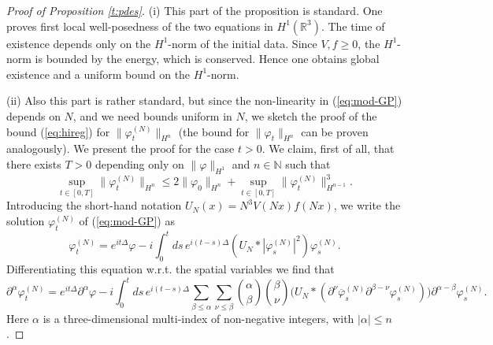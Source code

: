 \documentclass[11pt,a4paper]{article}
\newcommand{\done}{}
\newcommand{\bR}{{\mathbb R}}
\newcommand{\bN}{{\mathbb N}}
\newcommand{\cE}{{\cal E}}
\newcommand{\ph}{\varphi_t^{(N)}}	%
\begin{document}
\begin{proof}[Proof of Proposition \ref{t:pdes}] 
(i) This part of the proposition is standard. One proves first local well-posedness of the two equations in $H^1 (\bR^3)$. The time of existence depends only on the $H^1$-norm of the initial data. Since $V,f \geq 0$, the $H^1$-norm is bounded by the energy, which is conserved.  
Hence one obtains global existence and a uniform bound on the $H^1$-norm. 

(ii) Also this part is rather standard, but since the non-linearity in (\ref{eq:mod-GP}) depends on $N$, and we need bounds uniform in $N$, we sketch the proof of the bound (\ref{eq:hireg}) for $\| \varphi_t^{(N)} \|_{H^n}$ (the bound for $\| \varphi_t \|_{H^n}$ can be proven analogously). We present the proof for the case $t >0$. We claim, first of all, that there exists $T>0$ depending only on $\| \varphi \|_{H^1}$ and $n \in \bN$ such that
  \begin{equation}\label{eq:preregularity}
    \sup_{t \in [0,T]} \| \varphi_t^{(N)} \|_{H^n} \le 2 \| \varphi_0 \|_{H^n} +
     \sup_{t \in [0,T]} \| \varphi_t^{(N)} \|_{H^{n-1}}^3.\done
 \end{equation}
 Introducing the short-hand notation $U_N (x)= N^3 V(Nx)f(Nx)$, we write the solution 
$\varphi_t^{(N)}$ of (\ref{eq:mod-GP}) as
\[
\varphi^{(N)}_t = e^{it\Delta} \varphi - i \int_0^t ds \, e^{i(t-s)\Delta} (U_N *
|\varphi^{(N)}_s|^2) \varphi^{(N)}_s.\]
Differentiating this equation w.r.t. the spatial variables we find that
\[
    \partial^\alpha \varphi^{(N)}_t = e^{it \Delta} \partial^\alpha \varphi - i
    \int_0^t ds \, e^{i(t-s) \Delta} \sum_{\beta \le \alpha} \sum_{\nu \le
    \beta} \binom{\alpha}{\beta} \binom{\beta}{\nu} \big( U_N * (\partial^\nu
    \overline{\varphi}^{(N)}_s \partial^{\beta - \nu} \varphi^{(N)}_s) \big)
    \partial^{\alpha - \beta} \varphi^{(N)}_s. \]
Here $\alpha$ is a three-dimensional multi-index of non-negative integers, with $|\alpha| \leq n$.
  

\end{proof}
\end{document}

